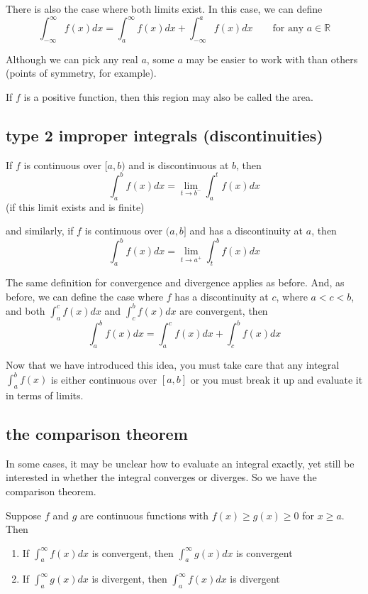 \documentclass[10pt,a4paper]{report}
\begin{document}
There is also the case where both limits exist. In this case, we can define
$$
	\int_{-\infty}^{\infty} f(x) dx = \int_a^{\infty} f(x) dx + \int_{-\infty}^a f(x) dx \qquad \text{for any } a \in \mathbb{R}
$$

Although we can pick any real $a$, some $a$ may be easier to work with than others (points of symmetry, for example).

If $f$ is a positive function, then this region may also be called the area.


\subsection{type 2 improper integrals (discontinuities)}

If $f$ is continuous over $[a, b)$ and is discontinuous at $b$, then
$$
	\int_a^b f(x)dx = \lim_{t \to b^-} \int_a^t f(x) dx
$$
(if this limit exists and is finite)

and similarly, if $f$ is continuous over $(a, b]$ and has a discontinuity at $a$, then
$$
	\int_a^b f(x)dx = \lim_{t \to a^+} \int_t^b f(x) dx
$$

The same definition for convergence and divergence applies as before. And, as before, we can define the case where $f$ has a discontinuity at $c$, where $a < c < b$, and both $\int_a^c f(x)dx$ and $\int_c^b f(x) dx$ are convergent, then
$$
	\int_a^b f(x) dx = \int_a^c f(x) dx + \int_c^b f(x) dx
$$

Now that we have introduced this idea, you must take care that any integral $\int_a^b f(x)$ is either continuous over $[a, b]$ or you must break it up and evaluate it in terms of limits.

\subsection{the comparison theorem}

In some cases, it may be unclear how to evaluate an integral exactly, yet still be interested in whether the integral converges or diverges. So we have the comparison theorem.

Suppose $f$ and $g$ are continuous functions with $f(x) \geq g(x) \geq 0$ for $x \geq a$. Then
\begin{enumerate}
	\item If $\int_a^{\infty} f(x) dx$ is convergent, then $\int_a^{\infty} g(x) dx$ is convergent
	\item If $\int_a^{\infty} g(x) dx$ is divergent, then $\int_a^{\infty} f(x) dx$ is divergent
\end{enumerate}
\end{document}
